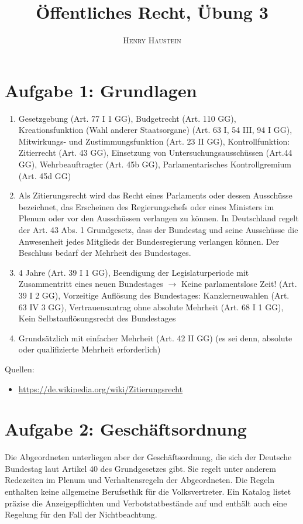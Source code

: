 \documentclass{article}
\title{\textbf{Öffentliches Recht, Übung 3}}
\author{\textsc{Henry Haustein}}
\date{}
\begin{document}
	\maketitle
	
	\section*{Aufgabe 1: Grundlagen}
	\begin{enumerate}[label=(\alph*)]
		\item Gesetzgebung (Art. 77 I 1 GG), Budgetrecht (Art. 110 GG), Kreationsfunktion (Wahl anderer Staatsorgane) (Art. 63 I, 54 III, 94 I GG), Mitwirkungs- und Zustimmungsfunktion (Art. 23 II GG), Kontrollfunktion: Zitierrecht (Art. 43 GG), Einsetzung von Untersuchungsausschüssen (Art.44 GG), Wehrbeauftragter (Art. 45b GG), Parlamentarisches Kontrollgremium (Art. 45d GG)
		\item Als Zitierungsrecht wird das Recht eines Parlaments oder dessen Ausschüsse bezeichnet, das Erscheinen des Regierungschefs oder eines Ministers im Plenum oder vor den Ausschüssen verlangen zu können. In Deutschland regelt der Art. 43 Abs. 1 Grundgesetz, dass der Bundestag und seine Ausschüsse die Anwesenheit jedes Mitglieds der Bundesregierung verlangen können. Der Beschluss bedarf der Mehrheit des Bundestages.
		\item 4 Jahre (Art. 39 I 1 GG), Beendigung der Legislaturperiode mit Zusammentritt eines neuen Bundestages $\to$ Keine parlamentslose Zeit! (Art. 39 I 2 GG), Vorzeitige Auflösung des Bundestages: Kanzlerneuwahlen (Art. 63 IV 3 GG), Vertrauensantrag ohne absolute Mehrheit (Art. 68 I 1 GG), Kein Selbstauflösungsrecht des Bundestages
		\item Grundsätzlich mit einfacher Mehrheit (Art. 42 II GG) (es sei denn, absolute oder qualifizierte Mehrheit erforderlich)
	\end{enumerate}
	
	Quellen:
	\begin{itemize}
		\item \url{https://de.wikipedia.org/wiki/Zitierungsrecht}
	\end{itemize}

	\section*{Aufgabe 2: Geschäftsordnung}
	Die Abgeordneten unterliegen aber der Geschäftsordnung, die sich der Deutsche Bundestag laut Artikel 40 des Grundgesetzes gibt. Sie regelt unter anderem Redezeiten im Plenum und Verhaltensregeln der Abgeordneten. Die Regeln enthalten keine allgemeine Berufsethik für die Volksvertreter. Ein Katalog listet präzise die Anzeigepflichten und Verbotstatbestände auf und enthält auch eine Regelung für den Fall der Nichtbeachtung.
\end{document}
